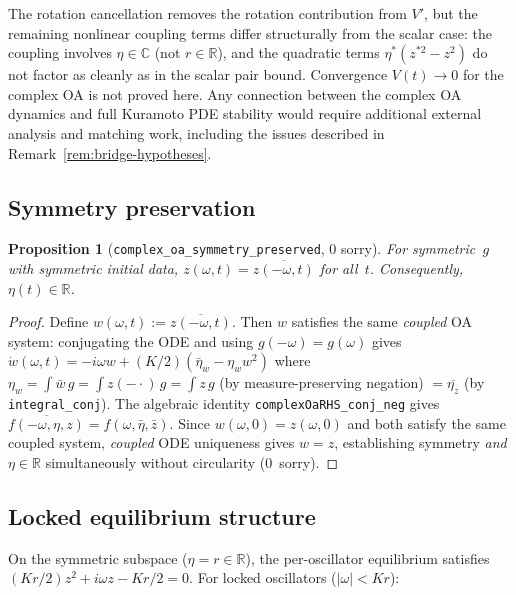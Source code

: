 \documentclass[11pt,a4paper]{article}
\newtheorem{proposition}[theorem]{Proposition}
\theoremstyle{definition}
\newcommand{\R}{\mathbb{R}}
\newcommand{\C}{\mathbb{C}}
\begin{document}
The rotation cancellation removes the rotation contribution from $V'$, but the remaining nonlinear coupling terms differ structurally from the scalar case: the coupling involves $\eta \in \C$ (not $r \in \R$), and the quadratic terms $\eta^*(z^{*2} - z^2)$ do not factor as cleanly as in the scalar pair bound. Convergence $V(t) \to 0$ for the complex OA is not proved here. Any connection between the complex OA dynamics and full Kuramoto PDE stability would require additional external analysis and matching work, including the issues described in Remark~\ref{rem:bridge-hypotheses}.

\subsection{Symmetry preservation}

\begin{proposition}[\texttt{complex\_oa\_symmetry\_preserved}, 0 sorry]
For symmetric~$g$ with symmetric initial data, $z(\omega,t) = \overline{z(-\omega,t)}$ for all~$t$. Consequently, $\eta(t) \in \R$.
\end{proposition}
\begin{proof}
Define $w(\omega,t) := \overline{z(-\omega,t)}$. Then $w$ satisfies the same \emph{coupled} OA system: conjugating the ODE and using $g(-\omega) = g(\omega)$ gives $\dot w(\omega,t) = -i\omega w + (K/2)(\bar\eta_w - \eta_w w^2)$ where $\eta_w = \int \bar w\,g = \int z(-\cdot)\,g = \int z\,g$ (by measure-preserving negation) $= \overline{\eta_z}$ (by \texttt{integral\_conj}). The algebraic identity \texttt{complexOaRHS\_conj\_neg} gives $\overline{f(-\omega,\eta,z)} = f(\omega,\bar\eta,\bar z)$. Since $w(\omega,0) = z(\omega,0)$ and both satisfy the same coupled system, \emph{coupled} ODE uniqueness gives $w = z$, establishing symmetry \emph{and} $\eta \in \R$ simultaneously without circularity (0~sorry).
\end{proof}

\subsection{Locked equilibrium structure}

On the symmetric subspace ($\eta = r \in \R$), the per-oscillator equilibrium satisfies $(Kr/2)z^2 + i\omega z - Kr/2 = 0$. For locked oscillators ($|\omega| < Kr$):
\end{document}
